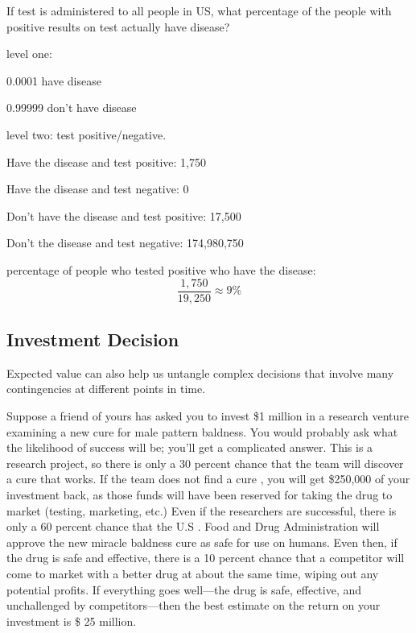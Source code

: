 \documentclass[landscape]{exam}
\begin{document}
  If test is administered to all people in US, what percentage of the people
  with positive results on test actually have disease?


  \begin{solution}
    level one:
    \begin{itemize*}
      \item 0.0001 have disease
      \item 0.99999 don't have disease
    \end{itemize*}

    level two: test positive/negative. 
    \begin{itemize*}
      \item Have the disease and test positive: 1,750
      \item Have the disease and test negative: 0
      \item Don't have the disease and test positive: 17,500
      \item Don't the disease and test negative: 174,980,750
    \end{itemize*}

    percentage of people who tested positive who have the disease:
    \[
      \frac{1,750}{19,250} \approx 9\%
    \]

  \end{solution}

  \subsection{Investment Decision}
  Expected value can also help us untangle complex decisions that involve many
  contingencies at different points in time. 

  Suppose a friend of yours has asked you to invest \$1 million in a research
  venture examining a new cure for male pattern baldness. You would probably ask
  what the likelihood of success will be; you’ll get a complicated answer. This
  is a research project, so there is only a 30 percent chance that the team will
  discover a cure that works. If the team does not find a cure , you will get
  \$250,000 of your investment back, as those funds will have been reserved for
  taking the drug to market (testing, marketing, etc.) Even if the researchers
  are successful, there is only a 60 percent chance that the U.S . Food and Drug
  Administration will approve the new miracle baldness cure as safe for use on
  humans. Even then, if the drug is safe and effective, there is a 10 percent
  chance that a competitor will come to market with a better drug at about the
  same time, wiping out any potential profits. If everything goes well---the drug
  is safe, effective, and unchallenged by competitors---then the best estimate
  on the return on your investment is \$ 25 million. 
\end{document}
